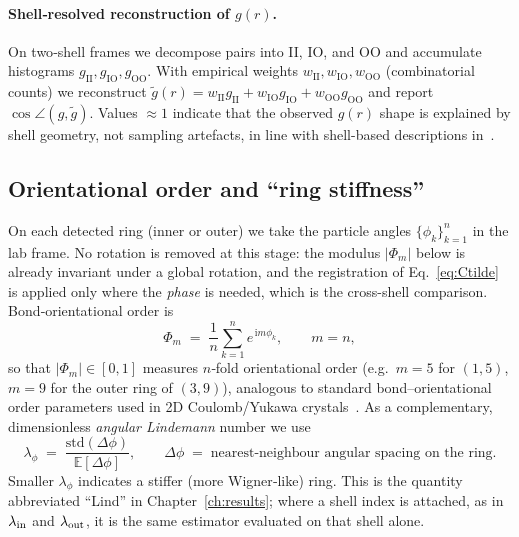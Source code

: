 \paragraph{Shell‐resolved reconstruction of $g(r)$.}
On two‐shell frames we decompose pairs into II, IO, and OO and accumulate histograms
$g_{\mathrm{II}},g_{\mathrm{IO}},g_{\mathrm{OO}}$. With empirical weights
$w_{\mathrm{II}},w_{\mathrm{IO}},w_{\mathrm{OO}}$ (combinatorial counts) we reconstruct
\(\tilde g(r)=w_{\mathrm{II}}g_{\mathrm{II}}+w_{\mathrm{IO}}g_{\mathrm{IO}}+w_{\mathrm{OO}}g_{\mathrm{OO}}\)
and report $\cos\angle(g,\tilde g)$.
Values $\approx 1$ indicate that the observed $g(r)$ shape is explained by shell geometry, not sampling artefacts,
in line with shell-based descriptions in~\cite{schweigert1994spectralpropertieschargedparticles,Kong_2002,manninen2007metalclustersquantumdots}.

\subsection{Orientational order and “ring stiffness”}
\label{subsec:orient}

On each detected ring (inner or outer) we take the particle angles $\{\phi_k\}_{k=1}^n$ in
the lab frame. No rotation is removed at this stage: the modulus $|\Phi_m|$ below is already
invariant under a global rotation, and the registration of Eq.~\eqref{eq:Ctilde} is applied
only where the \emph{phase} is needed, which is the cross-shell comparison.
Bond‐orientational order is
\begin{equation}
\Phi_m \;=\; \frac{1}{n}\sum_{k=1}^n e^{\,\mathrm{i} m \phi_k},
\qquad m=n,
\end{equation}
so that $|\Phi_m|\in[0,1]$ measures $n$‐fold orientational order (e.g.\ $m{=}5$ for $(1,5)$, $m{=}9$ for the outer ring of $(3,9)$),
analogous to standard bond–orientational order parameters used in 2D Coulomb/Yukawa crystals~\cite{Mazars_2008}.
As a complementary, dimensionless \emph{angular Lindemann} number we use
\begin{equation}
\lambda_\phi \;=\; \frac{\mathrm{std}(\Delta\phi)}{\mathbb{E}[\Delta\phi]},
\qquad 
\Delta\phi\;=\;\text{nearest‐neighbour angular spacing on the ring}.
\end{equation}
Smaller $\lambda_\phi$ indicates a stiffer (more Wigner‐like) ring. This is the quantity
abbreviated ``Lind'' in Chapter~\ref{ch:results}; where a shell index is attached, as in
$\lambda_{\rm in}$ and $\lambda_{\rm out}$, it is the same estimator evaluated on that
shell alone.

